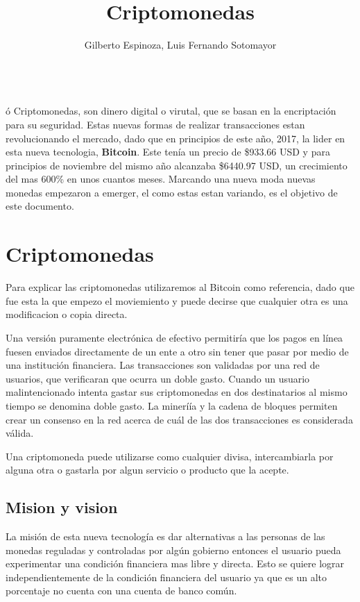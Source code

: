 \documentclass[12pt,letterpaper]{article}
\title{Criptomonedas}
\author{Gilberto Espinoza, Luis Fernando Sotomayor}
\begin{document}
\maketitle
\abstractname{\\ó Criptomonedas, son dinero digital o virutal, que se basan en la encriptaci\'on para su seguridad. Estas nuevas formas de realizar transacciones estan revolucionando el mercado, dado que en principios de este a\~no, 2017, la lider en esta nueva tecnologia, \textbf{Bitcoin}. Este ten\'ia un precio de \$933.66 USD y para principios de noviembre del mismo a\~no alcanzaba \$6440.97 USD, un crecimiento del mas 600\% en unos cuantos meses. Marcando una nueva moda nuevas monedas empezaron a emerger, el como estas estan variando, es el objetivo de este documento. }

\section*{Criptomonedas}
	Para explicar las criptomonedas utilizaremos al Bitcoin como referencia, dado que fue esta la que empezo el moviemiento y puede decirse que cualquier otra es una modificacion o copia directa.

	Una versi\'on puramente electr\'onica de efectivo permitir\'ia que los pagos en l\'inea fuesen enviados directamente de un ente a otro sin tener que pasar por medio de una instituci\'on financiera. Las transacciones son validadas por una red de usuarios, que verificaran que ocurra un doble gasto. Cuando un usuario malintencionado intenta gastar sus criptomonedas en dos destinatarios al mismo tiempo se denomina doble gasto. La miner\'i\'ia y la cadena de bloques permiten crear un consenso en la red acerca de cu\'al de las dos transacciones es considerada v\'alida.
	
	Una criptomoneda puede utilizarse como cualquier divisa, intercambiarla por alguna otra o gastarla por algun servicio o producto que la acepte.
	\subsection*{Mision y vision}
	La misi\'on de esta nueva tecnolog\'ia es dar alternativas a las personas de las monedas reguladas y controladas por alg\'un gobierno entonces el usuario pueda experimentar una condici\'on financiera mas libre y directa. Esto se quiere lograr independientemente de la condici\'on financiera del usuario ya que es un alto porcentaje no cuenta con una cuenta de banco com\'un.
	
\end{document}
